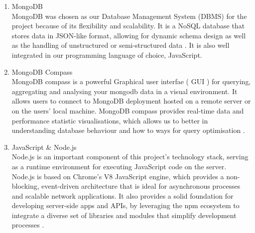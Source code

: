 \documentclass[a4paper,12pt]{article}  %
\begin{document}
\begin{enumerate}
      \item MongoDB\\
      MongoDB was chosen as our Database Management System (DBMS) for the project because of its flexibility and scalability. It is a NoSQL database that stores data in JSON-like format, allowing for dynamic schema design  as well as the handling of unstructured or semi-structured data \cite{mongodb}. It is also well integrated in our programming language of choice, JavaScript.\\

      \item MongoDB Compass\\
      MongoDB compass is a powerful Graphical user interfae ( GUI ) for querying, aggregating and analysing your mongodb data in a visual environment. It allows users to connect to MongoDB deployment hosted on a remote server or on the users’ local machine. MongoDB compass provides real-time data and performance statistic visualisations, which allows us to better in understanding database behaviour and how to ways for query optimisation \cite{mongodb_compass}.\\

      \item JavaScript \& Node.js\\
      Node.js is an important component of this project's technology stack, serving as a runtime environment for executing JavaScript code on the server. Node.js is based on Chrome's V8 JavaScript engine, which provides a non-blocking, event-driven architecture that is ideal for asynchronous processes and scalable network applications. It also provides a solid foundation for developing server-side apps and APIs, by leveraging the npm ecosystem to integrate a diverse set of libraries and modules that simplify development processes \cite{nodejs2024} \cite{geeksforgeeks2024} \cite{w3schools2024}.\\


\end{enumerate}
\end{document}
